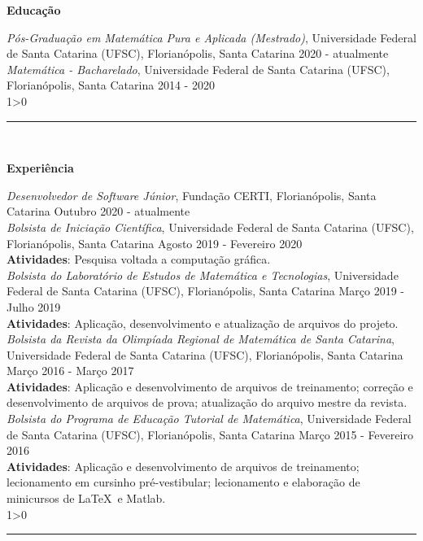 \documentclass[a4paper,10pt]{article}
\newcommand{\criaSecao}[4][0]{
    \noindent
	\begin{minipage}{0.16\linewidth}
		\large{\textbf{#2}}
		\vspace{#3\baselineskip}
	\end{minipage}
	\hfill
	\begin{minipage}{0.79\linewidth}
		#4
		\ifnum0#1>0 { \hrule {\ } } \fi
	\end{minipage}
	\vspace{\baselineskip}
}
\begin{document}
	\vspace{\baselineskip}
	
    \criaSecao[1]{Educação}{4}{
        \textit{Pós-Graduação em Matemática Pura e Aplicada (Mestrado)}, Universidade Federal de Santa Catarina (UFSC), Florianópolis, Santa Catarina \hfill 2020 - atualmente \\
		
		\textit{Matemática - Bacharelado}, Universidade Federal de Santa Catarina (UFSC), Florianópolis, Santa Catarina \hfill 2014 - 2020 \\
    }
    
    \criaSecao[1]{Experiência}{17}{
        \textit{Desenvolvedor de Software Júnior}, Fundação CERTI, Florianópolis, Santa Catarina \hfill Outubro 2020 - atualmente \\
        
        \textit{Bolsista de Iniciação Científica}, Universidade Federal de Santa Catarina (UFSC), Florianópolis, Santa Catarina \hfill Agosto 2019 - Fevereiro 2020 \\
		\textbf{Atividades}: Pesquisa voltada a computação gráfica.\\
		
		\textit{Bolsista do Laboratório de Estudos de Matemática e Tecnologias}, Universidade Federal de Santa Catarina (UFSC), Florianópolis, Santa Catarina \hfill Março 2019 - Julho 2019 \\
		\textbf{Atividades}: Aplicação, desenvolvimento e atualização de arquivos do projeto.\\
		
		\textit{Bolsista da Revista da Olimpíada Regional de Matemática de Santa Catarina}, Universidade Federal de Santa Catarina (UFSC), Florianópolis, Santa Catarina \hfill Março 2016 - Março 2017 \\
		\textbf{Atividades}: Aplicação e desenvolvimento de arquivos de treinamento; correção e desenvolvimento de arquivos de prova; atualização do arquivo mestre da revista.\\
		
		\textit{Bolsista do Programa de Educação Tutorial de Matemática}, Universidade Federal de Santa Catarina (UFSC), Florianópolis, Santa Catarina \hfill Março 2015 - Fevereiro 2016 \\
		\textbf{Atividades}: Aplicação e desenvolvimento de arquivos de treinamento; lecionamento em cursinho pré-vestibular; lecionamento e elaboração de minicursos de \LaTeX\ e Matlab. \\
    }
    
\end{document}
